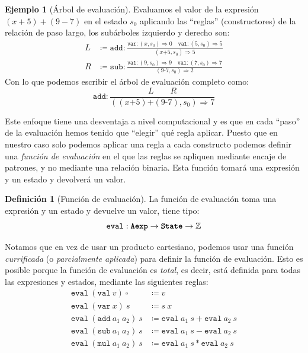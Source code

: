 \documentclass[
  a4paper, 
  10pt, 
  parskip=half, 
  toc=bibliography,
]{scrbook}
\theoremstyle{definition}
\theoremstyle{bolddef}
\newtheorem{definition}[theorem]{Definición}
\newtheorem{example}[theorem]{Ejemplo}
\newcommand{\funfont}[1]{\texttt{#1}}
\newcommand{\tyfont}[1]{\texttt{\textbf{#1}}}
\newcommand{\placeholder}{\square}
\newcommand{\ImpPlus}{\mathbin{\texttt{+}}}
\newcommand{\ImpMinus}{\mathbin{\texttt{-}}}
\newcommand{\bigstep}{\Longrightarrow}
\begin{document}
\begin{example}[Árbol de evaluación]\label{ex:arithmetic_evaluation}
  Evaluamos el valor de la expresión \((x + 5) + (9 - 7)\) en el estado \(s_0\)
  aplicando las \enquote{reglas} (constructores) de la relación de paso largo,
  los subárboles izquierdo y derecho son:
  \begin{align*}
    L &\coloneqq \funfont{add}: \displaystyle{\frac{
      \funfont{var}: (x, s_0) \bigstep 0
      \quad
      \funfont{val}: (5, s_0) \bigstep 5
    }{(x \ImpPlus 5, s_0) \bigstep 5}} \\
    R &\coloneqq \funfont{sub}: \displaystyle{\frac{
      \funfont{val}: (9, s_0) \bigstep 9
      \quad
      \funfont{val}: (7, s_0) \bigstep 7
    }{(9 \ImpMinus 7, s_0) \bigstep 2}}
  \end{align*}
  Con lo que podemos escribir el árbol de evaluación completo como:
\[
  \funfont{add}: \frac{
    L
    \qquad
    R    
  }
  {((x \ImpPlus 5) \ImpPlus (9 \ImpMinus 7), s_0) \bigstep 7}
\]
\end{example}

Este enfoque tiene una desventaja a nivel computacional y es que en cada
\enquote{paso} de la evaluación hemos tenido que \enquote{elegir} qué regla
aplicar. Puesto que en nuestro caso solo podemos aplicar una regla a cada 
constructo podemos definir una \emph{función de evaluación} en el que las
reglas se apliquen mediante encaje de patrones, y no mediante una relación
binaria. Esta función tomará una expresión y un estado y devolverá un valor.

\begin{definition}[Función de evaluación]
  La función de evaluación toma una expresión y un estado y devuelve un valor,
  tiene tipo:
  \[
  \funfont{eval} : \tyfont{Aexp} \to \tyfont{State} \to \mathbb{Z}
  \]
\end{definition}

Notamos que en vez de usar un producto cartesiano, podemos usar una función
\emph{currificada} (o \emph{parcialmente aplicada}) para definir la función de
evaluación. Esto es posible porque la función de evaluación es \emph{total},
es decir, está definida para todas las expresiones y estados, mediante las 
siguientes reglas:
\begin{align*}
  \funfont{eval} \ (\funfont{val} \ v) \ \placeholder &\coloneqq v \\
  \funfont{eval} \ (\funfont{var} \ x) \ s &\coloneqq s \ x \\
  \funfont{eval} \ (\funfont{add} \ a_1 \ a_2) \ s &\coloneqq \funfont{eval} \ a_1 \ s + \funfont{eval} \ a_2 \ s \\
  \funfont{eval} \ (\funfont{sub} \ a_1 \ a_2) \ s &\coloneqq \funfont{eval} \ a_1 \ s - \funfont{eval} \ a_2 \ s \\
  \funfont{eval} \ (\funfont{mul} \ a_1 \ a_2) \ s &\coloneqq \funfont{eval} \ a_1 \ s * \funfont{eval} \ a_2 \ s
\end{align*}
\end{document}
